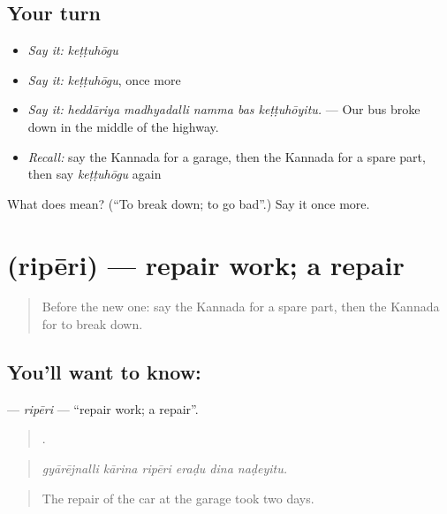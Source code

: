 \subsection*{Your turn}
\begin{itemize}
\raggedright
  \item \emph{Say it:} \emph{keṭṭuhōgu}
  \item \emph{Say it:} \emph{keṭṭuhōgu}, once more
  \item \emph{Say it:} \emph{heddāriya madhyadalli namma bas keṭṭuhōyitu.} — Our bus broke down in the middle of the highway.
  \item \emph{Recall:} say the Kannada for a garage, then the Kannada for a spare part, then say \emph{keṭṭuhōgu} again
\end{itemize}

\begin{tcolorbox}[breakable,colback=teal!4,colframe=teal!35!black,title={Before you move on}]
What does  mean? (\textquotedblleft{}To break down; to go bad\textquotedblright{}.) Say it once more.
\end{tcolorbox}
\section[\texorpdfstring{\kn{ರಿಪೇರಿ} (ripēri)}{ರಿಪೇರಿ (ripēri)}]{ (ripēri) — repair work; a repair}

\label{lesson:KA-C450-riperi}



\begin{quote}
Before the new one: say the Kannada for a spare part, then the Kannada for to break down.
\end{quote}

\subsection*{You'll want to know: }
\textbf{} — \emph{ripēri} — \textquotedblleft{}repair work; a repair\textquotedblright{}.

\begin{quote}
     .
\end{quote}

\begin{quote}
\emph{gyārējnalli kārina ripēri eraḍu dina naḍeyitu.}
\end{quote}

\begin{quote}
The repair of the car at the garage took two days.
\end{quote}

